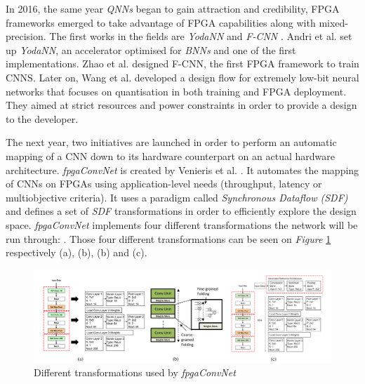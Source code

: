 In 2016, the same year \emph{QNNs} began to gain attraction and credibility, FPGA frameworks emerged to take advantage of FPGA capabilities along with mixed-precision. The first works in the fields are \emph{YodaNN} \cite{Andri2016} and \emph{F-CNN} \cite{Zhao2016}. Andri et al. set up \emph{YodaNN}, an accelerator optimised for \emph{BNNs} and one of the first implementations. Zhao et al. \cite{Zhao2016} designed F-CNN, the first FPGA framework to train CNNS. Later on, Wang et al. \cite{Wang2018} developed a design flow for extremely low-bit neural networks that focuses on quantisation in both training and FPGA deployment. They aimed at strict resources and power constraints in order to provide a design to the developer.

The next year, two initiatives are launched in order to perform an automatic mapping of a CNN down to its hardware counterpart on an actual hardware architecture. \emph{fpgaConvNet} is created by Venieris et al. \cite{Venieris2017}. It automates the mapping of CNNs on FPGAs using application-level needs (throughput, latency or multiobjective criteria). It uses a paradigm called \emph{Synchronous Dataflow (SDF)} and defines a set of \emph{SDF} transformations in order to efficiently explore the design space. \emph{fpgaConvNet} implements four different transformations the network will be run through: . Those four different transformations can be seen on \emph{Figure} \ref{fig:fpgaConvNetTransformations} respectively (a), (b), (b) and (c).

\begin{figure}[htbp]
	\centering
		\includegraphics[width=\textwidth]{Figures/fpgaConvNetTransformations.png}
	\caption[Inference Optimisations]{Different transformations used by \emph{fpgaConvNet} \cite{Venieris2017}}
	\label{fig:fpgaConvNetTransformations}
\end{figure}


